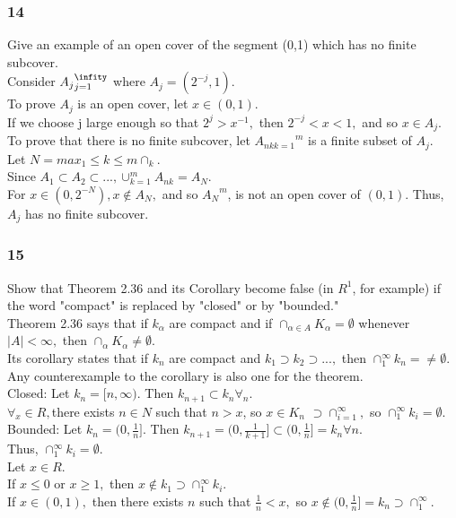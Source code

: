 \subsubsection*{14}
Give an example of an open cover of the segment (0,1) which has no finite subcover. \\ 
Consider ${A_j}_{j=1}^{\infity}$ where $A_j=(2^{-j},1).$\\ 
To prove ${A_j}$ is an open cover, let $x \in (0,1).$\\ 
If we choose j large enough so that $2^{j}>x^{-1},$ then $2^{-j}<x<1,$ and so $x \in A_j.$ To prove that there is no finite subcover, let ${A_{nk k=1}}^{m}$ is a finite subset of ${A_j}.$\\ Let $N=max_{1} \leq k \leq m \cap_{k}.$\\
Since $A_1 \subset A_2 \subset ..., \cup_{k=1}^m A_{nk}=A_N.$\\ 
For $x \in (0,2^{-N}),x \notin A_N,$ and so ${A_N}^m$, is not an open cover of $(0,1).$ Thus, ${A_j}$ has no finite subcover.  

\subsubsection*{15}
Show that Theorem 2.36 and its Corollary become false (in $R^1$, for example) if the word "compact" is replaced by "closed" or by "bounded."\\ 
Theorem 2.36 says that if ${k_\alpha}$ are compact and if $\cap_{\alpha \in A}K_{\alpha}=\emptyset$ whenever $|A|<\infty,$ then $\cap_{\alpha}K_{\alpha} \neq \emptyset.$ \\ 
Its corollary states that if ${k_n}$ are compact and $k_1 \supset k_2 \supset ...,$ then $\cap_{1}^\infty k_n= \neq \emptyset.$ Any counterexample to the corollary is also one for the theorem. \\ 
Closed: Let $k_n=[n, \infty).$ Then $k_{n+1} \subset k_n \forall_n.$\\ 
$\forall_x \in R, $there exists $n \in N$ such that $n>x$, so $x \in K_n$ $\supset \cap_{i=1}^\infty,$ so $\cap_{1}^{\infty} k_i=\emptyset.$\\ 
Bounded: Let $k_n=(0,\frac{1}{n}].$ Then $k_{n+1}=(0,\frac{1}{k+1}] \subset (0, \frac{1}{n}]=k_n \forall n.$\\ 
Thus, $\cap_{1}^\infty k_i=\emptyset.$\\ 
Let $x \in R.$\\ 
If $ x \leq 0$ or $x \geq 1,$ then $x \notin k_1 \supset \cap_{1}^{\infty}k_i.$\\ 
If $x \in (0,1),$ then there exists $n$ such that $\frac{1}{n}<x,$ so $x \notin (0, \frac{1}{n}]= k_n \supset \cap_1^\infty.$


